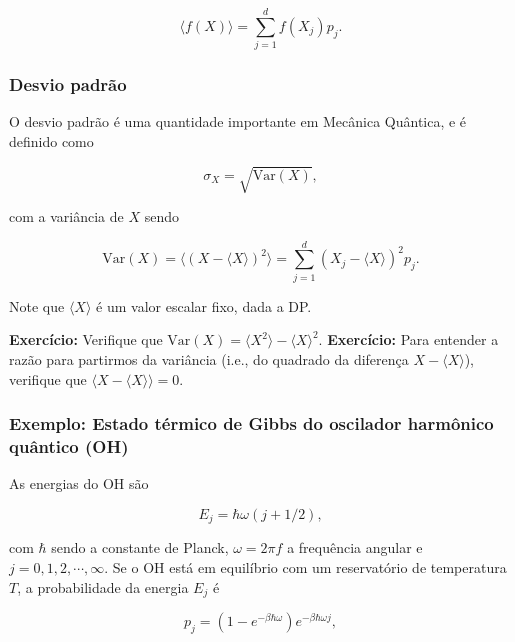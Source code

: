 \documentclass[11pt]{article}
\begin{document}
\begin{equation}
\langle f(X) \rangle = \sum_{j=1}^{d} f(X_{j})p_{j}.
\end{equation}

\subsubsection{Desvio padrão}\label{desvio-padruxe3o}

O desvio padrão é uma quantidade importante em Mecânica Quântica, e é
definido como

\begin{equation}
\sigma_{X}=\sqrt{\mathrm{Var}(X)},
\end{equation}

com a variância de \(X\) sendo

\begin{equation}
\mathrm{Var}(X)=\langle (X-\langle X\rangle)^{2}\rangle = \sum_{j=1}^{d} (X_{j}-\langle X\rangle)^{2} p_{j}.
\end{equation}

Note que \(\langle X\rangle\) é um valor escalar fixo, dada a DP.

\textbf{Exercício:} Verifique que
\(\mathrm{Var}(X)=\langle X^{2}\rangle - \langle X\rangle^{2}.\)
\textbf{Exercício:} Para entender a razão para partirmos da variância
(i.e., do quadrado da diferença \(X-\langle X\rangle\)), verifique que
\(\langle X-\langle X\rangle\rangle = 0\).

    \subsubsection{Exemplo: Estado térmico de Gibbs do oscilador harmônico
quântico
(OH)}\label{exemplo-estado-tuxe9rmico-de-gibbs-do-oscilador-harmuxf4nico-quuxe2ntico-oh}

As energias do OH são

\begin{equation}
E_{j} = \hbar\omega(j+1/2),
\end{equation}

com \(\hbar\) sendo a constante de Planck, \(\omega=2\pi f\) a
frequência angular e \(j = 0, 1, 2, \cdots, \infty\). Se o OH está em
equilíbrio com um reservatório de temperatura \(T\), a probabilidade da
energia \(E_{j}\) é

\begin{equation}
p_{j} = (1-e^{-\beta\hbar\omega})e^{-\beta\hbar\omega j},
\end{equation}
\end{document}
